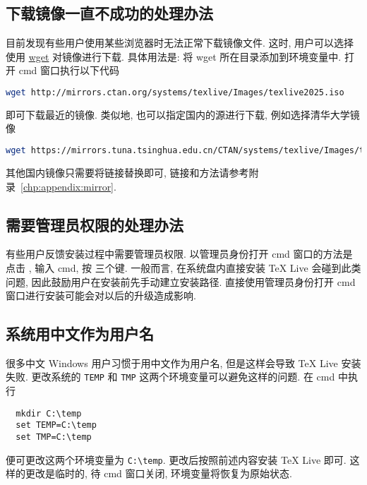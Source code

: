 \subsection{下载镜像一直不成功的处理办法}

目前发现有些用户使用某些浏览器时无法正常下载镜像文件.
这时,
用户可以选择使用 \href{https://eternallybored.org/misc/wget/}{\textsf{wget}} 对镜像进行下载.
具体用法是:
将 \textsf{wget} 所在目录添加到环境变量中.
打开 \textsf{cmd} 窗口执行以下代码
\begin{lstlisting}[language = bash]
  wget http://mirrors.ctan.org/systems/texlive/Images/texlive2025.iso
\end{lstlisting}
即可下载最近的镜像.
类似地,
也可以指定国内的源进行下载,
例如选择清华大学镜像
\begin{lstlisting}[language = bash]
  wget https://mirrors.tuna.tsinghua.edu.cn/CTAN/systems/texlive/Images/texlive2025.iso
\end{lstlisting}
其他国内镜像只需要将链接替换即可,
链接和方法请参考附录~\ref{chp:appendix:mirror}.

\subsection{需要管理员权限的处理办法}

有些用户反馈安装过程中需要管理员权限.
以管理员身份打开 \textsf{cmd} 窗口的方法是点击 \keys{\faWindows},
输入 \textsf{cmd},
按 \keys{\ctrl + \shift + \enter} 三个键.
一般而言,
在系统盘内直接安装 \TeX{} Live 会碰到此类问题,
因此鼓励用户在安装前先手动建立安装路径.
直接使用管理员身份打开 \textsf{cmd} 窗口进行安装可能会对以后的升级造成影响.

\subsection{系统用中文作为用户名}\label{sec:chinesename}

很多中文 Windows 用户习惯于用中文作为用户名,
但是这样会导致 \TeX{} Live 安装失败.
更改系统的 \texttt{TEMP} 和 \texttt{TMP} 这两个环境变量可以避免这样的问题.
在 \textsf{cmd} 中执行
\begin{lstlisting}
  mkdir C:\temp
  set TEMP=C:\temp
  set TMP=C:\temp
\end{lstlisting}
便可更改这两个环境变量为 \texttt{C:\textbackslash temp}.
更改后按照前述内容安装 \TeX{} Live 即可.
这样的更改是临时的,
待 \textsf{cmd} 窗口关闭,
环境变量将恢复为原始状态.

